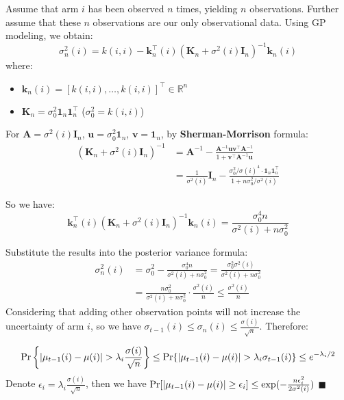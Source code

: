 \documentclass[opre,sglanonrev]{informs4}
\begin{document}
Assume that arm $i$ has been observed $n$ times, yielding $n$ observations. Further assume that these $n$ observations are our only observational data. Using GP modeling, we obtain:
\[
\sigma_n^2(i) = k(i,i) - \mathbf{k}_n^\top(i)(\mathbf{K}_n + \sigma^2(i)\mathbf{I}_n)^{-1}\mathbf{k}_n(i)
\]
where:
\begin{itemize}
    \item $\mathbf{k}_n(i) = [k(i,i),\dots,k(i,i)]^\top \in \mathbb{R}^n$
    \item $\mathbf{K}_n = \sigma_0^2\mathbf{1}_n\mathbf{1}_n^\top$ ($\sigma_0^2 = k(i,i)$)
\end{itemize} %

For $\mathbf{A} = \sigma^2(i)\mathbf{I}_n$, $\mathbf{u} = \sigma_0^2\mathbf{1}_n$, $\mathbf{v} = \mathbf{1}_n$, by \textbf{Sherman-Morrison} formula:
\begin{equation*}
\begin{aligned}
(\mathbf{K}_n + \sigma^2(i)\mathbf{I}_n)^{-1} &= \mathbf{A}^{-1} - \frac{\mathbf{A}^{-1}\mathbf{u}\mathbf{v}^\top\mathbf{A}^{-1}}{1 + \mathbf{v}^\top\mathbf{A}^{-1}\mathbf{u}} \\
&= \frac{1}{\sigma^2(i)}\mathbf{I}_n - \frac{\sigma_0^2/\sigma(i)^4 \cdot \mathbf{1}_n\mathbf{1}_n^\top}{1 + n\sigma_0^2/\sigma^2(i)}
\end{aligned}
\end{equation*} 

So we have:
\[
\mathbf{k}_n^\top(i)(\mathbf{K}_n + \sigma^2(i)\mathbf{I}_n)^{-1}\mathbf{k}_n(i) = \frac{\sigma_0^4n}{\sigma^2(i) + n\sigma_0^2}
\]

Substitute the results into the posterior variance formula:
\begin{equation*}
\begin{aligned}
\sigma_n^2(i) &= \sigma_0^2 - \frac{\sigma_0^4n}{\sigma^2(i) + n\sigma_0^2} = \frac{\sigma_0^2\sigma^2(i)}{\sigma^2(i) + n\sigma_0^2} \\
&= \frac{n\sigma_0^2}{\sigma^2(i)+n\sigma_0^2}\cdot \frac{\sigma^2(i)}{n} \leq \frac{\sigma^2(i)}{n}
\end{aligned}
\end{equation*} 
Considering that adding other observation points will not increase the uncertainty of arm $i$, so we have $\sigma_{t-1}(i) \leq \sigma_n(i) \leq \frac{\sigma(i)}{\sqrt{n}}$. Therefore:

$$\textnormal{Pr}\left\{|\mu_{t-1}(i)-\mu(i)|>\lambda_i \frac{\sigma(i)}{\sqrt{n}}\right\}\leq\textnormal{Pr}\{|\mu_{t-1}(i)-\mu(i)|>\lambda_i \sigma_{t-1}(i)\}\leq e^{-\lambda_i/2}$$
Denote $\epsilon_i = \lambda_i \frac{\sigma(i)}{\sqrt{n}}$, then we have $\textnormal{Pr}[|\mu_{t-1}(i)-\mu(i)|\geq \epsilon_i]\leq \exp(-\frac{n\epsilon_i^2}{2\sigma^2(i)})$  \hfill $\blacksquare$
\end{document}
